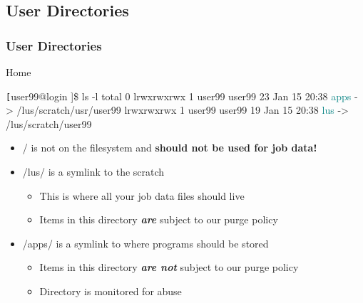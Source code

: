 \subsection{User Directories}
\begin{frame}[fragile]
\frametitle{User Directories}
\begin{block}{Home}
\begin{semiverbatim}\tiny \texttt
[user99@login \ctilde]\$ ls -l 
total 0
lrwxrwxrwx 1 user99 user99 23 Jan 15 20:38 \textcolor{teal}{apps} -> /lus/scratch/usr/user99
lrwxrwxrwx 1 user99 user99 19 Jan 15 20:38 \textcolor{teal}{lus} -> /lus/scratch/user99

\end{semiverbatim}
\end{block}
\begin{itemize}\footnotesize
		\item \ctilde{}/ is not on the {\lustre} filesystem and \textbf{should not be used for job data!}
		\item \ctilde{}/lus/ is a symlink to the {\lustre} scratch
		\begin{itemize}\tiny
			\item This is where all your job data files should live
			\item Items in this directory \emph{\textbf{are}} subject to our purge policy
		\end{itemize}
		\item \ctilde{}/apps/ is a symlink to where programs should be stored
		\begin{itemize}\tiny
			\item Items in this directory \emph{\textbf{are not}} subject to our purge policy
			\item Directory is monitored for abuse
		\end{itemize}
	\end{itemize}
\end{frame}


